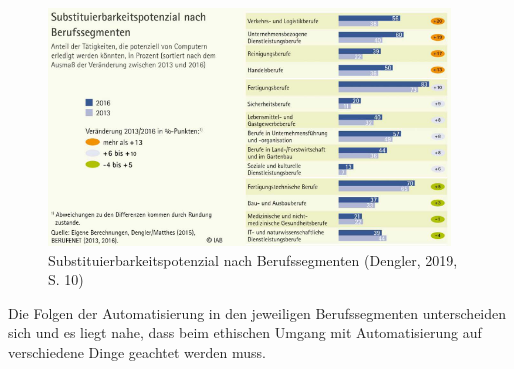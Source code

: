 \begin{figure}[]
  \centering
  \includegraphics[width=0.95\textwidth]{Bilder/iab-substituierbarkeitspotenzial.png}
  \caption{Substituierbarkeitspotenzial nach Berufssegmenten (Dengler, 2019, S. 10)}
  \label{fig:bildlabel}
\end{figure}

\newpage

Die Folgen der Automatisierung in den jeweiligen Berufssegmenten unterscheiden sich und es liegt nahe, dass beim ethischen Umgang mit Automatisierung auf verschiedene Dinge geachtet werden muss.
